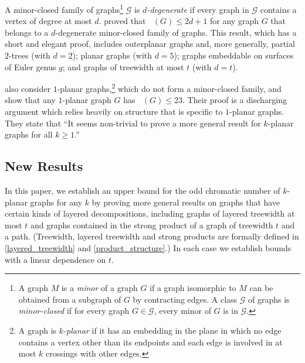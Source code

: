 \documentclass{patmorin}
\DeclareMathOperator{\odd}{\chi_o}
\begin{document}
A minor-closed family of graphs\footnote{A graph $M$ is a \textit{minor} of a graph $G$ if a graph isomorphic to $M$ can be obtained from a subgraph of $G$ by contracting edges. A class $\mathcal{G}$ of graphs is \emph{minor-closed} if for every graph $G\in\mathcal{G}$, every minor of $G$ is in $\mathcal{G}$.} $\mathcal{G}$ is \emph{$d$-degenerate} if every graph in $\mathcal{G}$ contains a vertex of degree at most $d$.
\citet{cranston.lafferty.ea:note} proved that $\odd(G)\le 2d+1$ for any graph $G$ that belongs to a $d$-degenerate minor-closed family of graphs.  This result, which has a short and elegant proof, includes outerplanar graphs and, more generally, partial $2$-trees (with $d=2$); planar graphs (with $d=5$); graphs embeddable on surfaces of Euler genus $g$; and graphs of treewidth at most $t$ (with $d=t$).

\citet{cranston.lafferty.ea:note} also consider $1$-planar graphs,\footnote{A graph is \emph{$k$-planar} if it has an embedding in the plane in which no edge contains a vertex other than its endpoints and each edge is involved in at most $k$ crossings with other edges.} which do not form a minor-closed family, and show that any $1$-planar graph $G$ has $\odd(G)\le 23$. Their proof is a discharging argument which relies heavily on structure that is specific to $1$-planar graphs.  They state that ``It seems non-trivial to prove a more general result for $k$-planar graphs for all $k\ge 1$.''





\subsection{New Results}

In this paper, we establish an upper bound for the odd chromatic number of $k$-planar graphs for any $k$ by proving more general results on graphs that have
certain kinds of layered decompositions, including graphs of layered treewidth at most $t$ and graphs contained in the strong product of a graph of treewidth $t$ and a path.  (Treewidth, layered treewidth and strong products are formally defined in \cref{layered_treewidth} and \cref{product_structure}.)
In each case we establish bounds with a linear dependence on $t$.
\end{document}

